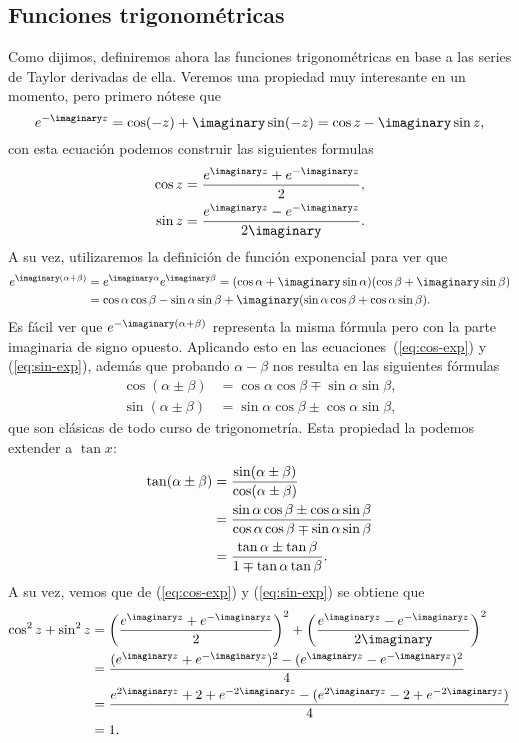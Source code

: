 \documentclass[11pt,oneside,a4paper]{book}
\begin{document}
\subsection*{Funciones trigonométricas}
Como dijimos, definiremos ahora las funciones trigonométricas en base a las series de Taylor derivadas de ella. Veremos una propiedad muy interesante en un momento, pero primero nótese que
$$e^{-\imaginary z}=\cos(-z)+\imaginary\sin(-z)=\cos z-\imaginary\sin z,$$
con esta ecuación podemos construir las siguientes formulas
\begin{align}
\cos z&=\frac{e^{\imaginary z}+e^{-\imaginary z}}{2}\label{eq:cos-exp},\\
\sin z&=\frac{e^{\imaginary z}-e^{-\imaginary z}}{2\imaginary}\label{eq:sin-exp}.
\end{align}
A su vez, utilizaremos la definición de función exponencial para ver que
\begin{align*}
e^{\imaginary(\alpha+\beta)}&=e^{\imaginary\alpha}e^{\imaginary\beta}=(\cos\alpha+\imaginary\sin\alpha)(\cos\beta+\imaginary\sin\beta)\\
&=\cos\alpha\cos\beta-\sin\alpha\sin\beta+\imaginary(\sin\alpha\cos\beta+\cos\alpha\sin\beta).
\end{align*}
Es fácil ver que $e^{-\imaginary(\alpha+\beta)}$ representa la misma fórmula pero con la parte imaginaria de signo opuesto. Aplicando esto en las ecuaciones~(\ref{eq:cos-exp}) y (\ref{eq:sin-exp}), además que probando $\alpha-\beta$ nos resulta en las siguientes fórmulas
\begin{align}
\cos(\alpha\pm\beta)&=\cos\alpha\cos\beta\mp\sin\alpha\sin\beta,\\
\sin(\alpha\pm\beta)&=\sin\alpha\cos\beta\pm\cos\alpha\sin\beta,
\end{align}
que son clásicas de todo curso de trigonometría. Esta propiedad la podemos extender a $\tan x$:
\begin{align}
\tan(\alpha\pm\beta)&=\frac{\sin(\alpha\pm\beta)}{\cos(\alpha\pm\beta)}\notag\\
&=\frac{\sin\alpha\cos\beta\pm\cos\alpha\sin\beta}{\cos\alpha\cos\beta\mp\sin\alpha\sin\beta}\notag\\
&=\frac{\tan\alpha\pm\tan\beta}{1\mp\tan\alpha\tan\beta}.
\end{align}
A su vez, vemos que de (\ref{eq:cos-exp}) y (\ref{eq:sin-exp}) se obtiene que
\begin{align}
\cos^2z+\sin^2z&=\left(\frac{e^{\imaginary z}+e^{-\imaginary z}}{2}\right)^2+\left(\frac{e^{\imaginary z}-e^{-\imaginary z}}{2\imaginary}\right)^2\notag\\
&=\frac{(e^{\imaginary z}+e^{-\imaginary z})^2-(e^{\imaginary z}-e^{-\imaginary z})^2}{4}\notag\\
&=\frac{e^{2\imaginary z}+2+e^{-2\imaginary z}-(e^{2\imaginary z}-2+e^{-2\imaginary z})}{4}\notag\\
&=1.\label{eq:trig-identity}
\end{align}
\end{document}
